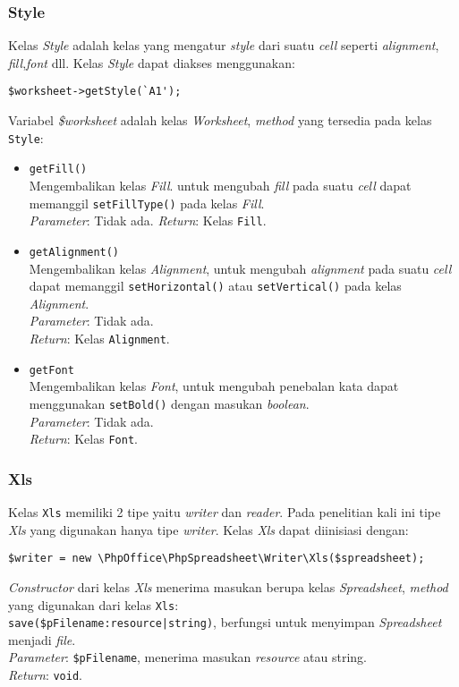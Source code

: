 \subsubsection{Style}
Kelas \textit{Style} adalah kelas yang mengatur \textit{style} dari suatu \textit{cell} seperti \textit{alignment}, \textit{fill},\textit{font} dll. Kelas \textit{Style} dapat diakses menggunakan:
\begin{lstlisting}
$worksheet->getStyle(`A1');
\end{lstlisting}
Variabel \textit{\$worksheet} adalah kelas \textit{Worksheet}, \textit{method} yang tersedia pada kelas \texttt{Style}:
	\begin{itemize}
		\item \texttt{getFill()} \\
		 Mengembalikan kelas \textit{Fill}. untuk mengubah \textit{fill} pada suatu \textit{cell} dapat memanggil \texttt{set\-Fill\-Type()} pada kelas \textit{Fill}.	\\
		 \textit{Parameter}: Tidak ada.
		 \textit{Return}: Kelas \texttt{Fill}.
		\item \texttt{getAlignment()} \\
		 Mengembalikan kelas \textit{Alignment}, untuk mengubah \textit{alignment} pada suatu \textit{cell} dapat memanggil \texttt{setHorizontal()} atau \texttt{setVertical()} pada kelas \textit{Alignment}. \\
		\textit{Parameter}: Tidak ada. \\
		\textit{Return}: Kelas \texttt{Alignment}.
		\item \texttt{getFont} \\
		 Mengembalikan kelas \textit{Font}, untuk mengubah penebalan kata dapat menggunakan \texttt{setBold()} dengan masukan \textit{boolean}. \\
		\textit{Parameter}: Tidak ada. \\
		\textit{Return}: Kelas \texttt{Font}.
		
	\end{itemize}

\subsubsection{Xls} 
Kelas \texttt{Xls} memiliki 2 tipe yaitu \textit{writer} dan \textit{reader}. Pada penelitian kali ini tipe \textit{Xls} yang digunakan hanya tipe \textit{writer}. Kelas \textit{Xls} dapat diinisiasi dengan:
\begin{lstlisting}
$writer = new \PhpOffice\PhpSpreadsheet\Writer\Xls($spreadsheet);
\end{lstlisting}
\textit{Constructor} dari kelas \textit{Xls} menerima masukan berupa kelas \textit{Spreadsheet}, \textit{method} yang digunakan dari kelas \texttt{Xls}: \\
\texttt{save(\$pFilename:resource|string)}, berfungsi untuk menyimpan \textit{Spreadsheet} menjadi \textit{file}. \\
\textit{Parameter}: \texttt{\$pFilename}, menerima masukan \textit{resource} atau string. \\
\textit{Return}: \texttt{void}. 





